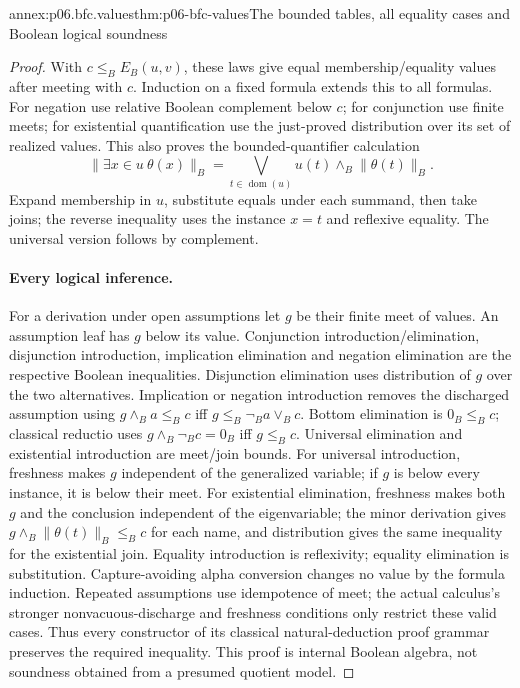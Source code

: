 \begin{annexitem}{annex:p06.bfc.values}{thm:p06-bfc-values}{The bounded tables, all equality cases and Boolean logical soundness}
\begin{proof}
With \(c\leq_B E_B(u,v)\), these laws give equal membership/equality
values after meeting with \(c\). Induction on a fixed formula extends
this to all formulas. For negation use relative Boolean complement below
\(c\); for conjunction use finite meets; for existential quantification
use the just-proved distribution over its set of realized values. This
also proves the bounded-quantifier calculation
\[
 \lVert\exists x\in u\ \theta(x)\rVert_B
 =\bigvee_{t\in\operatorname{dom}(u)}u(t)\wedge_B\lVert\theta(t)\rVert_B.
\]
Expand membership in \(u\), substitute equals under each summand,
then take joins; the reverse inequality uses the instance \(x=t\)
and reflexive equality. The universal version follows by complement.

\paragraph{Every logical inference.}
For a derivation under open assumptions let \(g\) be their finite meet
of values. An assumption leaf has \(g\) below its value. Conjunction
introduction/elimination, disjunction introduction, implication elimination
and negation elimination are the respective Boolean inequalities.
Disjunction elimination uses distribution of \(g\) over the two alternatives.
Implication or negation introduction removes the discharged assumption
using \(g\wedge_B a\leq_B c\) iff \(g\leq_B\neg_B a\vee_B c\).
Bottom elimination is \(0_B\leq_B c\); classical reductio uses
\(g\wedge_B\neg_B c=0_B\) iff \(g\leq_B c\).
Universal elimination and existential introduction are meet/join bounds.
For universal introduction, freshness makes \(g\) independent of the
generalized variable; if \(g\) is below every instance, it is below
their meet. For existential elimination, freshness makes both \(g\)
and the conclusion independent of the eigenvariable; the minor derivation
gives \(g\wedge_B\lVert\theta(t)\rVert_B\leq_B c\) for each name,
and distribution gives the same inequality for the existential join.
Equality introduction is reflexivity; equality elimination is substitution.
Capture-avoiding alpha conversion changes no value by the formula induction.
Repeated assumptions use idempotence of meet; the actual calculus's stronger
nonvacuous-discharge and freshness conditions only restrict these valid cases.
Thus every constructor of its classical natural-deduction proof grammar
preserves the required inequality. This proof is internal Boolean algebra,
not soundness obtained from a presumed quotient model.
\end{proof}
\end{annexitem}

